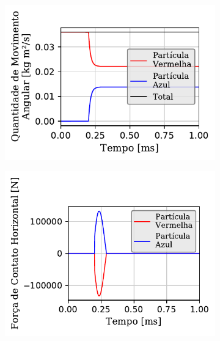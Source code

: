 \begin{figure}[H]
{\begin{subfigure}[t]{\smallresultsfigwidth}
			\caption{}
			\label{subfig:colliding_spheres:dissipative_rotation:y_linear_momentum}
		\end{subfigure}
		\begin{subfigure}[t]{\smallresultsfigwidth}
			\centering
			\includegraphics[scale=0.95]{images/colliding_spheres/dissipative_rotation/angularMomentum-Z_small_total_alternative.pdf}
			\caption{}
			\label{subfig:colliding_spheres:dissipative_rotation:z_angular_momentum}
		\end{subfigure}
		\begin{subfigure}[t]{\smallresultsfigwidth}
			\centering
			\includegraphics[scale=0.95]{images/colliding_spheres/dissipative_rotation/contactForce-X_small.pdf}
			\caption{}

\end{subfigure}}
\end{figure}
